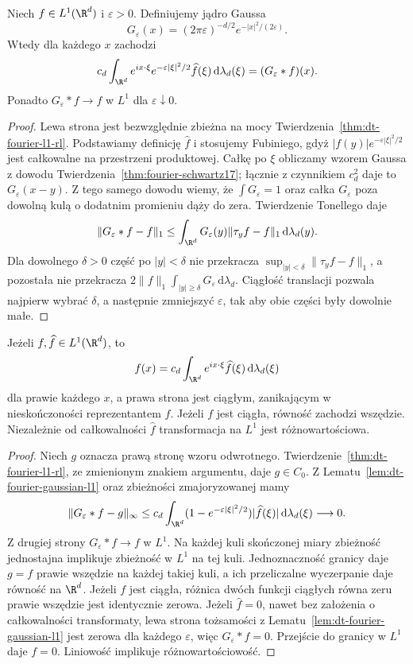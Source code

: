 \begin{lemat}
\label{lem:dt-fourier-gaussian-l1}
Niech $f\in L^1(\R^d)$ i $\varepsilon>0$.
Definiujemy jądro Gaussa
\[
 G_\varepsilon(x)=(2\pi\varepsilon)^{-d/2}
 e^{-|x|^2/(2\varepsilon)}.
\]
Wtedy dla każdego $x$ zachodzi
\[
 c_d\int_{\R^d}e^{ix\cdot\xi}
 e^{-\varepsilon|\xi|^2/2}\widehat f(\xi)
 \,\mathrm d\lambda_d(\xi)=(G_\varepsilon*f)(x).
\]
Ponadto $G_\varepsilon*f\to f$ w $L^1$ dla
$\varepsilon\downarrow0$.
\end{lemat}
\begin{proof}
Lewa strona jest bezwzględnie zbieżna na mocy
Twierdzenia~\ref{thm:dt-fourier-l1-rl}.
Podstawiamy definicję $\widehat f$ i stosujemy Fubiniego,
gdyż $|f(y)|e^{-\varepsilon|\xi|^2/2}$ jest całkowalne
na przestrzeni produktowej. Całkę po $\xi$ obliczamy
wzorem Gaussa z dowodu Twierdzenia~\ref{thm:fourier-schwartz17};
łącznie z czynnikiem $c_d^2$ daje to $G_\varepsilon(x-y)$.
Z tego samego dowodu wiemy, że $\int G_\varepsilon=1$
oraz całka $G_\varepsilon$ poza dowolną kulą o dodatnim
promieniu dąży do zera. Twierdzenie Tonellego daje
\[
 \|G_\varepsilon*f-f\|_1
 \le \int_{\R^d}G_\varepsilon(y)
 \|\tau_yf-f\|_1\,\mathrm d\lambda_d(y).
\]
Dla dowolnego $\delta>0$ część po $|y|<\delta$ nie
przekracza $\sup_{|y|<\delta}\|\tau_yf-f\|_1$,
a pozostała nie przekracza
$2\|f\|_1\int_{|y|\ge\delta}G_\varepsilon\,\mathrm d\lambda_d$.
Ciągłość translacji pozwala najpierw wybrać $\delta$,
a następnie zmniejszyć $\varepsilon$, tak aby obie
części były dowolnie małe.
\end{proof}

\begin{twierdzenie}
\label{thm:dt-fourier-l1-inversion}
Jeżeli $f,\widehat f\in L^1(\R^d)$, to
\[
 f(x)=c_d\int_{\R^d}e^{ix\cdot\xi}\widehat f(\xi)
 \,\mathrm d\lambda_d(\xi)
\]
dla prawie każdego $x$, a prawa strona jest ciągłym,
zanikającym w nieskończoności reprezentantem $f$.
Jeżeli $f$ jest ciągła, równość zachodzi wszędzie.
Niezależnie od całkowalności $\widehat f$ transformacja
na $L^1$ jest różnowartościowa.
\end{twierdzenie}
\begin{proof}
Niech $g$ oznacza prawą stronę wzoru odwrotnego.
Twierdzenie~\ref{thm:dt-fourier-l1-rl}, ze zmienionym
znakiem argumentu, daje $g\in C_0$.
Z Lematu~\ref{lem:dt-fourier-gaussian-l1} oraz
zbieżności zmajoryzowanej mamy
\[
 \|G_\varepsilon*f-g\|_\infty
 \le c_d\int_{\R^d}
 (1-e^{-\varepsilon|\xi|^2/2})|\widehat f(\xi)|
 \,\mathrm d\lambda_d(\xi)\longrightarrow0.
\]
Z drugiej strony $G_\varepsilon*f\to f$ w $L^1$.
Na każdej kuli skończonej miary zbieżność jednostajna
implikuje zbieżność w $L^1$ na tej kuli. Jednoznaczność
granicy daje $g=f$ prawie wszędzie na każdej takiej kuli,
a ich przeliczalne wyczerpanie daje równość na $\R^d$.
Jeżeli $f$ jest ciągła, różnica dwóch funkcji ciągłych
równa zeru prawie wszędzie jest identycznie zerowa.
Jeżeli $\widehat f=0$, nawet bez założenia o
całkowalności transformaty, lewa strona tożsamości
z Lematu~\ref{lem:dt-fourier-gaussian-l1} jest zerowa
dla każdego $\varepsilon$, więc $G_\varepsilon*f=0$.
Przejście do granicy w $L^1$ daje $f=0$.
Liniowość implikuje różnowartościowość.
\end{proof}

